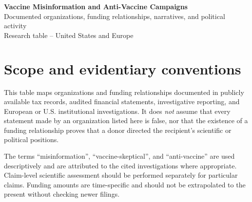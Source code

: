 \documentclass[11pt]{article}
\begin{document}
\begin{center}
{\Large\bfseries Vaccine Misinformation and Anti-Vaccine Campaigns}\\[4pt]
{\large Documented organizations, funding relationships, narratives, and political activity}\\[6pt]
{\small Research table -- United States and Europe}
\end{center}

\section*{Scope and evidentiary conventions}
This table maps organizations and funding relationships documented in publicly available
tax records, audited financial statements, investigative reporting, and European or
U.S. institutional investigations.  It does \emph{not} assume that every statement
made by an organization listed here is false, nor that the existence of a funding
relationship proves that a donor directed the recipient's scientific or political
positions.

The terms ``misinformation'', ``vaccine-skeptical'', and ``anti-vaccine'' are used
descriptively and are attributed to the cited investigations where appropriate.
Claim-level scientific assessment should be performed separately for particular
claims.  Funding amounts are time-specific and should not be extrapolated to the
present without checking newer filings.
\end{document}
